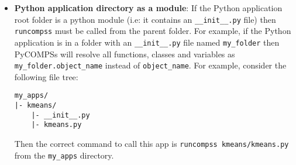 \begin{itemize}
\item \textbf{Python application directory as a module}:\newline
If the Python application root folder is a python module (i.e: it contains an \verb|__init__.py| file) then \verb|runcompss| must be called from
the parent folder. For example, if the Python application is in a folder with an \verb|__init__.py| file named \verb|my_folder| then PyCOMPSs will
resolve all functions, classes and variables as \verb|my_folder.object_name| instead of \verb|object_name|. For example, consider the following file
tree:
\begin{lstlisting}[]
my_apps/
|- kmeans/
    |- __init__.py
    |- kmeans.py
\end{lstlisting}
Then the correct command to call this app is \verb|runcompss kmeans/kmeans.py| from the \verb|my_apps| directory.


\end{itemize}


